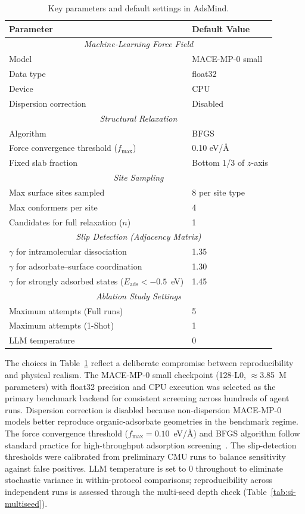 \documentclass[%
 preprint,
 superscriptaddress,
 amsmath,amssymb,
 aps,
 prb,
 floatfix,
]{revtex4-2}
\begin{document}
\begin{table}[ht]
\centering
\caption{Key parameters and default settings in AdsMind.}
\label{tab:si-parameters}
\begin{tabular}{ll}
\hline
\textbf{Parameter} & \textbf{Default Value} \\
\hline
\multicolumn{2}{c}{\textit{Machine-Learning Force Field}} \\
\hline
Model & MACE-MP-0 small \\
Data type & float32 \\
Device & CPU \\
Dispersion correction & Disabled \\
\hline
\multicolumn{2}{c}{\textit{Structural Relaxation}} \\
\hline
Algorithm & BFGS \\
Force convergence threshold ($f_{\text{max}}$) & 0.10 eV/\AA \\
Fixed slab fraction & Bottom 1/3 of $z$-axis \\
\hline
\multicolumn{2}{c}{\textit{Site Sampling}} \\
\hline
Max surface sites sampled & 8 per site type \\
Max conformers per site & 4 \\
Candidates for full relaxation ($n$) & 1 \\
\hline
\multicolumn{2}{c}{\textit{Slip Detection (Adjacency Matrix)}} \\
\hline
$\gamma$ for intramolecular dissociation & 1.35 \\
$\gamma$ for adsorbate--surface coordination & 1.30 \\
$\gamma$ for strongly adsorbed states ($E_{\text{ads}} < -0.5$~eV) & 1.45 \\
\hline
\multicolumn{2}{c}{\textit{Ablation Study Settings}} \\
\hline
Maximum attempts (Full runs) & 5 \\
Maximum attempts (1-Shot) & 1 \\
LLM temperature & 0 \\
\hline
\end{tabular}
\end{table}

The choices in Table~\ref{tab:si-parameters} reflect a deliberate compromise between reproducibility and physical realism. The MACE-MP-0 small checkpoint (128-L0, $\approx$3.85~M parameters) with float32 precision and CPU execution was selected as the primary benchmark backend for consistent screening across hundreds of agent runs. Dispersion correction is disabled because non-dispersion MACE-MP-0 models better reproduce organic-adsorbate geometries in the benchmark regime. The force convergence threshold ($f_{\mathrm{max}} = 0.10$~eV/\AA) and BFGS algorithm follow standard practice for high-throughput adsorption screening~\cite{nocedal2006numerical}. The slip-detection thresholds were calibrated from preliminary CMU runs to balance sensitivity against false positives. LLM temperature is set to 0 throughout to eliminate stochastic variance in within-protocol comparisons; reproducibility across independent runs is assessed through the multi-seed depth check (Table~\ref{tab:si-multiseed}).
\end{document}
